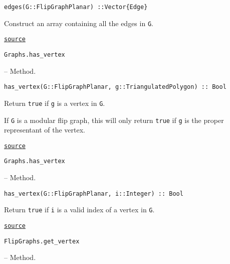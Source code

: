 \begin{adjustwidth}{2em}{0pt}


\begin{verbatim}
edges(G::FlipGraphPlanar) ::Vector{Edge}
\end{verbatim}

Construct an array containing all the edges in \texttt{G}.



\href{https://github.com/schto223/FlipGraphs.jl/blob/490c01a7adf74b42f27dda05099165c47ae8133e/src/flipGraphPlanar.jl#L24-L28}{\texttt{source}}


\end{adjustwidth}
\hypertarget{6073231109657752490}{\texttt{Graphs.has\_vertex}}  -- {Method.}

\begin{adjustwidth}{2em}{0pt}


\begin{verbatim}
has_vertex(G::FlipGraphPlanar, g::TriangulatedPolygon) :: Bool
\end{verbatim}

Return \texttt{true} if \texttt{g} is a vertex in \texttt{G}. 

If \texttt{G} is a modular flip graph, this will only return \texttt{true} if \texttt{g} is the proper representant of the vertex.



\href{https://github.com/schto223/FlipGraphs.jl/blob/490c01a7adf74b42f27dda05099165c47ae8133e/src/flipGraphPlanar.jl#L57-L63}{\texttt{source}}


\end{adjustwidth}
\hypertarget{11632110415817252502}{\texttt{Graphs.has\_vertex}}  -- {Method.}

\begin{adjustwidth}{2em}{0pt}


\begin{verbatim}
has_vertex(G::FlipGraphPlanar, i::Integer) :: Bool
\end{verbatim}

Return \texttt{true} if \texttt{i} is a valid index of a vertex in \texttt{G}.



\href{https://github.com/schto223/FlipGraphs.jl/blob/490c01a7adf74b42f27dda05099165c47ae8133e/src/flipGraphPlanar.jl#L50-L54}{\texttt{source}}


\end{adjustwidth}
\hypertarget{2888131517601982711}{\texttt{FlipGraphs.get\_vertex}}  -- {Method.}

